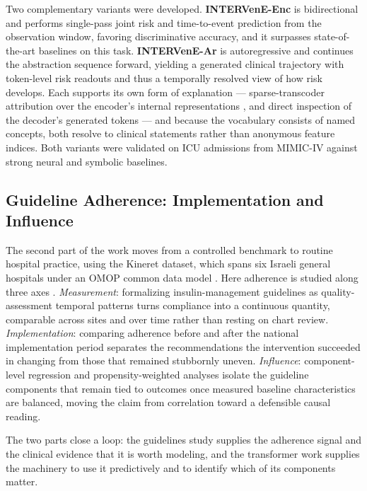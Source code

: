 Two complementary variants were developed. \textbf{INTERVenE-Enc} is bidirectional and performs single-pass joint risk and time-to-event prediction from the observation window, favoring discriminative accuracy, and it surpasses state-of-the-art baselines on this task. \textbf{INTERVenE-Ar} is autoregressive and continues the abstraction sequence forward, yielding a generated clinical trajectory with token-level risk readouts and thus a temporally resolved view of how risk develops. Each supports its own form of explanation --- sparse-transcoder attribution over the encoder's internal representations \citep{dunefsky2024transcoders}, and direct inspection of the decoder's generated tokens --- and because the vocabulary consists of named concepts, both resolve to clinical statements rather than anonymous feature indices. Both variants were validated on ICU admissions from MIMIC-IV \citep{johnson2023mimiciv} against strong neural and symbolic baselines.

\subsection{Guideline Adherence: Implementation and Influence}

The second part of the work moves from a controlled benchmark to routine hospital practice, using the Kineret dataset, which spans six Israeli general hospitals under an OMOP common data model \citep{kineret-israel-largest-hospital-network-omop-common-data-model}. Here adherence is studied along three axes \citep{kineret-guidelines-paper}. \emph{Measurement}: formalizing insulin-management guidelines as quality-assessment temporal patterns turns compliance into a continuous quantity, comparable across sites and over time rather than resting on chart review. \emph{Implementation}: comparing adherence before and after the national implementation period separates the recommendations the intervention succeeded in changing from those that remained stubbornly uneven. \emph{Influence}: component-level regression and propensity-weighted analyses isolate the guideline components that remain tied to outcomes once measured baseline characteristics are balanced, moving the claim from correlation toward a defensible causal reading.

The two parts close a loop: the guidelines study supplies the adherence signal and the clinical evidence that it is worth modeling, and the transformer work supplies the machinery to use it predictively and to identify which of its components matter.

